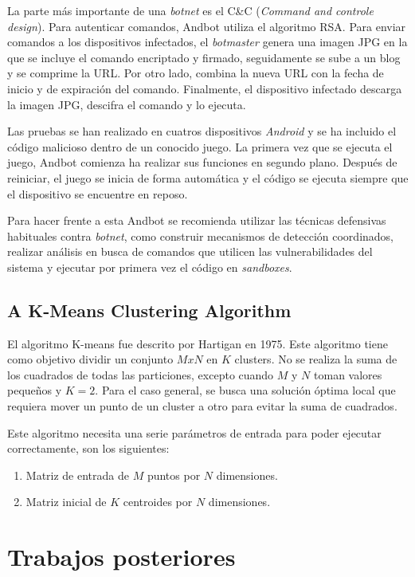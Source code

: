 \documentclass[a4paper,11pt]{report}
\begin{document}
La parte más importante de una \emph{botnet} es el C\&{}C (\emph{Command and controle design}). Para autenticar comandos, Andbot utiliza el algoritmo RSA. Para enviar comandos a los dispositivos infectados, el \emph{botmaster} genera una imagen JPG en la que se incluye el comando encriptado y firmado, seguidamente se sube a un blog y se comprime la URL. Por otro lado, combina la nueva URL con la fecha de inicio y de expiración del comando. Finalmente, el dispositivo infectado descarga la imagen JPG, descifra el comando y lo ejecuta.

Las pruebas se han realizado en cuatros dispositivos \emph{Android} y se ha incluido el código malicioso dentro de un conocido juego. La primera vez que se ejecuta el juego, Andbot comienza ha realizar sus funciones en segundo plano. Después de reiniciar, el juego se inicia de forma automática y el código se ejecuta siempre que el dispositivo se encuentre en reposo.

Para hacer frente a esta Andbot se recomienda utilizar las técnicas defensivas habituales contra \emph{botnet}, como construir mecanismos de detección coordinados, realizar análisis en busca de comandos que utilicen las vulnerabilidades del sistema y ejecutar por primera vez el código en \emph{sandboxes}.

\section*{A K-Means Clustering Algorithm}

El algoritmo K-means \cite{k-means} fue descrito por Hartigan en 1975. Este algoritmo tiene como objetivo dividir un conjunto $MxN$ en $K$ clusters. No se realiza la suma de los cuadrados de todas las particiones, excepto cuando $M$ y $N$ toman valores pequeños y $K=2$. Para el caso general, se busca una solución óptima local que requiera mover un punto de un cluster a otro para evitar la suma de cuadrados.

Este algoritmo necesita una serie parámetros de entrada para poder ejecutar correctamente, son los siguientes:

\begin{enumerate}
\item Matriz de entrada de $M$ puntos por $N$ dimensiones.
\item Matriz inicial de $K$ centroides por $N$ dimensiones.
\end{enumerate}


\chapter{Trabajos posteriores}
\end{document}
